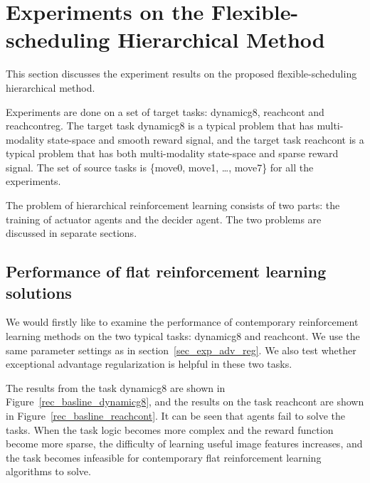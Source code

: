 
\section{Experiments on the Flexible-scheduling Hierarchical Method}
This section discusses the experiment results on the proposed flexible-scheduling hierarchical method.

Experiments are done on a set of target tasks: dynamicg8, reachcont and reachcontreg. The target task dynamicg8 is a typical problem that has multi-modality state-space and smooth reward signal, and the target task reachcont is a typical problem that has both multi-modality state-space and sparse reward signal. The set of source tasks is  \{move0, move1, \dots, move7\} for all the experiments.

The problem of hierarchical reinforcement learning consists of two parts: the training of actuator agents and the decider agent. The two problems are discussed in separate sections.

\subsection{Performance of flat reinforcement learning solutions}
We would firstly like to examine the performance of contemporary reinforcement learning methods on the two typical tasks: dynamicg8 and reachcont. We use the same parameter settings as in section~\ref{sec_exp_adv_reg}. We also test whether exceptional advantage regularization is helpful in these two tasks.

The results from the task dynamicg8 are shown in Figure~\ref{rec_basline_dynamicg8}, and the results on the task reachcont are shown in Figure~\ref{rec_basline_reachcont}. It can be seen that agents fail to solve the tasks. When the task logic becomes more complex and the reward function become more sparse, the difficulty of learning useful image features increases, and the task becomes infeasible for contemporary flat reinforcement learning algorithms to solve.

